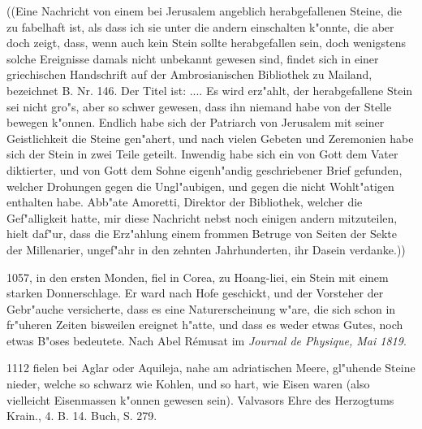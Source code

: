 \documentclass[a4paper, 11pt, oneside, polutonikogreek, german]{article}
\begin{document}
((Eine Nachricht von einem bei Jerusalem angeblich herabgefallenen Steine, die zu fabelhaft ist, als dass ich sie unter die andern einschalten k"onnte, die aber doch zeigt, dass, wenn auch kein Stein sollte herabgefallen sein, doch wenigstens solche Ereignisse damals nicht unbekannt gewesen sind, findet sich in einer griechischen Handschrift auf der Ambrosianischen Bibliothek zu Mailand, bezeichnet B. Nr. 146. Der Titel ist: .... Es wird erz"ahlt, der herabgefallene Stein sei nicht gro"s, aber so schwer gewesen, dass ihn niemand habe von der Stelle bewegen k"onnen. Endlich habe sich der Patriarch von Jerusalem mit seiner Geistlichkeit die Steine gen"ahert, und nach vielen Gebeten und Zeremonien habe sich der Stein in zwei Teile geteilt. Inwendig habe sich ein von Gott dem Vater diktierter, und von Gott dem Sohne eigenh"andig geschriebener Brief gefunden, welcher Drohungen gegen die Ungl"aubigen, und gegen die nicht Wohlt"atigen enthalten habe. Abb"ate Amoretti, Direktor der Bibliothek, welcher die Gef"alligkeit hatte, mir diese Nachricht nebst noch einigen andern mitzuteilen, hielt daf"ur, dass die Erz"ahlung einem frommen Betruge von Seiten der Sekte der Millenarier, ungef"ahr in den zehnten Jahrhunderten, ihr Dasein verdanke.))

1057, in den ersten Monden, fiel in Corea, zu Hoang-liei, ein Stein mit einem starken Donnerschlage. Er ward nach Hofe geschickt, und der Vorsteher der Gebr"auche versicherte, dass es eine Naturerscheinung w"are, die sich schon in fr"uheren Zeiten bisweilen ereignet h"atte, und dass es weder etwas Gutes, noch etwas B"oses bedeutete. Nach Abel Rémusat im \emph{Journal de Physique, Mai 1819}.

1112 fielen bei Aglar oder Aquileja, nahe am adriatischen Meere, gl"uhende Steine nieder, welche so schwarz wie Kohlen, und so hart, wie Eisen waren (also vielleicht Eisenmassen k"onnen gewesen sein). Valvasors Ehre des Herzogtums Krain., 4. B. 14. Buch, S. 279.
\end{document}
